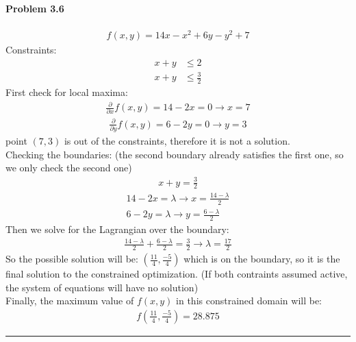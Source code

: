 \documentclass[12pt, letterpaper]{scrartcl}
\begin{document}
\paragraph*{Problem 3.6} \hfill\newline
\begin{align*}
    f(x,y)=14x-x^2+6y-y^2+7
\end{align*}
Constraints:
\begin{align*}
    x+y&\leq 2\\
    x+y&\leq \frac{3}{2}
\end{align*}
First check for local maxima:
\begin{align*}
    \frac{\partial}{\partial x}f(x,y)=14-2x=0 \longrightarrow x=7
\end{align*}
\begin{align*}
    \frac{\partial}{\partial y}f(x,y)=6-2y=0 \longrightarrow y=3
\end{align*}
point $(7, 3)$ is out of the constraints, therefore it is not a solution.\\
Checking the boundaries: (the second boundary already satisfies the first one, so we only check the second one)
\begin{align*}
    x+y=\frac{3}{2}
\end{align*}
\begin{align*}
14-2x=\lambda \longrightarrow x = \frac{14-\lambda}{2}\\
6-2y=\lambda \longrightarrow y = \frac{6-\lambda}{2}
\end{align*}
Then we solve for the Lagrangian over the boundary:
\begin{align*}
\frac{14-\lambda}{2}+\frac{6-\lambda}{2}=\frac{3}{2} \longrightarrow \lambda=\frac{17}{2} 
\end{align*}
So the possible solution will be: $(\frac{11}{4}, \frac{-5}{4})$ which is on the boundary, so it is the final solution to the constrained optimization.
(If both contraints assumed active, the system of equations will have no solution)\\
Finally, the maximum value of $f(x,y)$ in this constrained domain will be:
\begin{align*}
    f(\frac{11}{4}, \frac{-5}{4})=28.875
\end{align*}
\hrule
\end{document}
